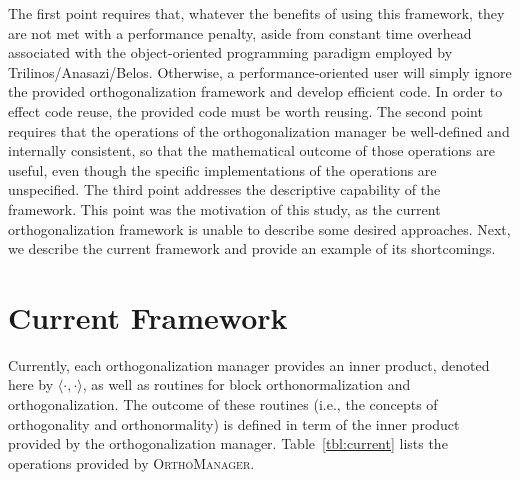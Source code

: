 \documentclass[12pt,letterpaper]{SANDreport}
\theoremstyle{example}
\newcommand{\inner}[2]{\langle #1,#2 \rangle}
\begin{document}
The first point requires that, whatever the benefits of using this framework, they are not
met with a performance penalty, aside from constant time overhead associated with the
object-oriented programming paradigm employed by Trilinos/Anasazi/Belos. Otherwise, a
performance-oriented user will simply ignore the provided orthogonalization framework and
develop efficient code. In order to effect code reuse, the provided code must be worth
reusing. The second point requires that the operations of the orthogonalization manager be
well-defined and internally consistent, so that the mathematical outcome of those
operations are useful, even though the specific implementations of the operations are
unspecified. The third point addresses the descriptive capability of the framework. This
point was the motivation of this study, as the current orthogonalization framework is
unable to describe some desired approaches.  Next, we describe the current framework and
provide an example of its shortcomings.


\section{Current Framework}

Currently, each orthogonalization manager provides an inner product, denoted
here by $\inner{\cdot}{\cdot}$, as well as routines for block orthonormalization
and orthogonalization. The outcome of these routines (i.e., the concepts of
orthogonality and orthonormality) is defined in term of the inner product
provided by the orthogonalization manager. Table~\ref{tbl:current} lists the
operations provided by \textsc{OrthoManager}.
\end{document}

